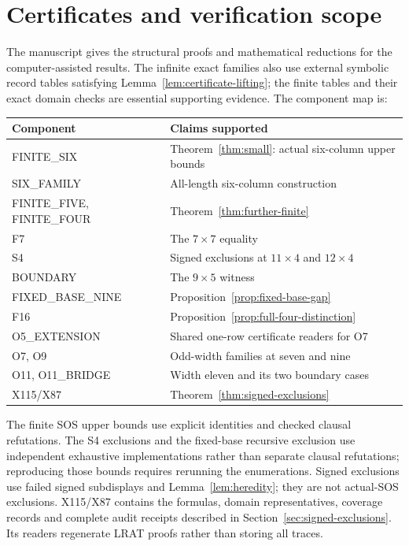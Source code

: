 \documentclass[11pt,a4paper]{article}
\theoremstyle{definition}
\begin{document}
\section{Certificates and verification scope}\label{app:data}
The manuscript gives the structural proofs and mathematical reductions
for the computer-assisted results. The infinite exact families also use
external symbolic record tables satisfying
Lemma~\ref{lem:certificate-lifting}; the finite tables and their exact
domain checks are essential supporting evidence. The component map is:
\begin{center}\small
\begin{tabular}{ll}
\toprule
Component&Claims supported\\\midrule
FINITE\_SIX&Theorem~\ref{thm:small}: actual six-column upper bounds\\
SIX\_FAMILY&All-length six-column construction\\
FINITE\_FIVE, FINITE\_FOUR&Theorem~\ref{thm:further-finite}\\
F7&The $7\times7$ equality\\
S4&Signed exclusions at $11\times4$ and $12\times4$\\
BOUNDARY&The $9\times5$ witness\\
FIXED\_BASE\_NINE&Proposition~\ref{prop:fixed-base-gap}\\
F16&Proposition~\ref{prop:full-four-distinction}\\
O5\_EXTENSION&Shared one-row certificate readers for O7\\
O7, O9&Odd-width families at seven and nine\\
O11, O11\_BRIDGE&Width eleven and its two boundary cases\\
X115/X87&Theorem~\ref{thm:signed-exclusions}\\\bottomrule
\end{tabular}
\end{center}
The finite SOS upper bounds use explicit identities and checked clausal
refutations. The S4 exclusions and the fixed-base recursive exclusion use
independent exhaustive implementations rather than separate clausal
refutations; reproducing those bounds requires rerunning the enumerations. Signed exclusions use failed signed subdisplays and
Lemma~\ref{lem:heredity}; they are not actual-SOS exclusions. X115/X87
contains the formulas, domain representatives, coverage records and
complete audit receipts described in Section~\ref{sec:signed-exclusions}.
Its readers regenerate LRAT proofs rather than storing all traces.
\end{document}
